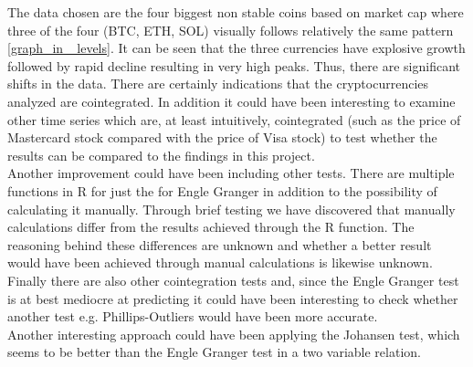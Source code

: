 \noindent The data chosen are the four biggest non stable coins based on market cap where three of the four (BTC, ETH, SOL) visually follows relatively the same pattern \ref{graph_in _levels}. It can be seen that the three currencies have explosive growth followed by rapid decline resulting in very high peaks. Thus, there are significant shifts in the data. There are certainly indications that the cryptocurrencies analyzed are cointegrated. In addition it could have been interesting to examine other time series which are, at least intuitively, cointegrated (such as the price of Mastercard stock compared with the price of Visa stock) to test whether the results can be compared to the findings in this project.\\

\noindent Another improvement could have been including other tests. There are multiple functions in R for just the for Engle Granger in addition to the possibility of calculating it manually. Through brief testing we have discovered that manually calculations differ from the results achieved through the R function. The reasoning behind these differences are unknown and whether a better result would have been achieved through manual calculations is likewise unknown. Finally there are also other cointegration tests and, since the Engle Granger test is at best mediocre at predicting it could have been interesting to check whether another test e.g. Phillips-Outliers would have been more accurate.\\

\noindent Another interesting approach could have been applying the Johansen test, which seems to be better than the Engle Granger test in a two variable relation.

